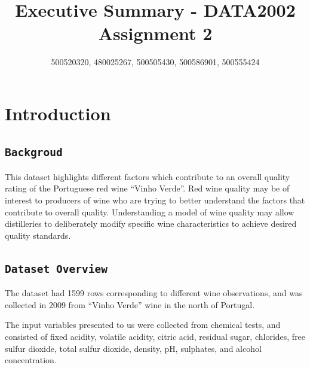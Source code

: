 \documentclass[letterpaper,8pt,twocolumn,twoside,]{pinp}
\title{Executive Summary - DATA2002 Assignment 2}
\author[]{500520320, 480025267, 500505430, 500586901, 500555424}
\affil[]{University of Sydney}
\begin{document}
\verticaladjustment{-2pt}

\maketitle
\thispagestyle{firststyle}



\hypertarget{introduction}{%
\section{Introduction}\label{introduction}}

\hypertarget{backgroud}{%
\subsection{\texorpdfstring{\texttt{Backgroud}}{Backgroud}}\label{backgroud}}

This dataset highlights different factors which contribute to an overall
quality rating of the Portuguese red wine ``Vinho Verde''. Red wine
quality may be of interest to producers of wine who are trying to better
understand the factors that contribute to overall quality. Understanding
a model of wine quality may allow distilleries to deliberately modify
specific wine characteristics to achieve desired quality standards.

\hypertarget{dataset-overview}{%
\subsection{\texorpdfstring{\texttt{Dataset\ Overview}}{Dataset Overview}}\label{dataset-overview}}

The dataset had 1599 rows corresponding to different wine observations,
and was collected in 2009 from ``Vinho Verde'' wine in the north of
Portugal.

The input variables presented to us were collected from chemical tests,
and consisted of fixed acidity, volatile acidity, citric acid, residual
sugar, chlorides, free sulfur dioxide, total sulfur dioxide, density,
pH, sulphates, and alcohol concentration.
\end{document}
